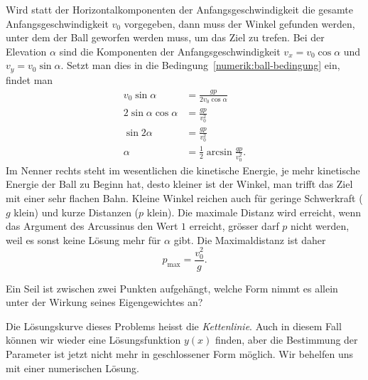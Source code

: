 Wird statt der Horizontalkomponenten der Anfangsgeschwindigkeit die
gesamte Anfangsgeschwindigkeit $v_0$ vorgegeben, dann muss der
Winkel gefunden werden, unter dem der Ball geworfen werden muss,
um das Ziel zu trefen.
Bei der Elevation $\alpha$ sind die Komponenten der Anfangsgeschwindigkeit
$v_x=v_0\cos\alpha$ und $v_y=v_0\sin\alpha$. 
Setzt man dies in die Bedingung~\eqref{numerik:ball-bedingung} ein,
findet man
\begin{align*}
v_0 \sin \alpha &=\frac{gp}{2v_0\cos\alpha}
\\
2\sin\alpha\cos\alpha&=\frac{gp}{v_0^2}
\\
\sin2\alpha&=\frac{gp}{v_0^2}
\\
\alpha&= \frac12 \arcsin\frac{gp}{v_0^2}.
\end{align*}
Im Nenner rechts steht im wesentlichen die kinetische Energie,
je mehr kinetische Energie der Ball zu Beginn hat, desto kleiner
ist der Winkel, man trifft das Ziel mit einer sehr flachen Bahn.
Kleine Winkel reichen auch für geringe Schwerkraft ($g$ klein)
und kurze Distanzen ($p$ klein).
Die maximale Distanz wird erreicht, wenn das Argument des Arcussinus
den Wert $1$ erreicht, grösser darf $p$ nicht werden, weil es sonst
keine Lösung mehr für $\alpha$ gibt.
Die Maximaldistanz ist daher
\[
p_{\text{max}} = \frac{v_0^2}{g}.
\]

\begin{aufgabe}
\label{numerik:aufgabe-seil}
Ein Seil ist zwischen zwei Punkten aufgehängt, welche Form nimmt es
allein unter der Wirkung seines Eigengewichtes an?
\end{aufgabe}
Die Lösungskurve dieses Problems heisst die {\em Kettenlinie}.
Auch in diesem Fall können wir wieder eine Lösungsfunktion $y(x)$ finden,
aber die Bestimmung der Parameter ist jetzt nicht mehr in geschlossener
Form möglich.
Wir behelfen uns mit einer numerischen Lösung.

